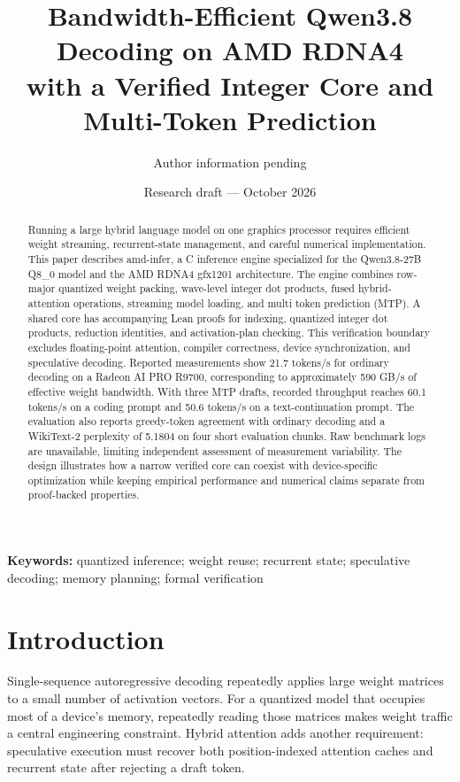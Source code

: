 \documentclass[10pt]{article}
\title{Bandwidth-Efficient Qwen3.8 Decoding on AMD RDNA4\\with a Verified Integer Core and Multi-Token Prediction}
\author{Author information pending}
\date{Research draft --- October 2026}
\begin{document}
\maketitle
\begin{abstract}
Running a large hybrid language model on one graphics processor requires efficient weight streaming, recurrent-state management, and careful numerical implementation. This paper describes amd-infer, a C inference engine specialized for the Qwen3.8-27B Q8\_0 model and the AMD RDNA4 gfx1201 architecture. The engine combines row-major quantized weight packing, wave-level integer dot products, fused hybrid-attention operations, streaming model loading, and multi token prediction (MTP). A shared core has accompanying Lean proofs for indexing, quantized integer dot products, reduction identities, and activation-plan checking. This verification boundary excludes floating-point attention, compiler correctness, device synchronization, and speculative decoding. Reported measurements show 21.7 tokens/s for ordinary decoding on a Radeon AI PRO R9700, corresponding to approximately 590 GB/s of effective weight bandwidth. With three MTP drafts, recorded throughput reaches 60.1 tokens/s on a coding prompt and 50.6 tokens/s on a text-continuation prompt. The evaluation also reports greedy-token agreement with ordinary decoding and a WikiText-2 perplexity of 5.1804 on four short evaluation chunks. Raw benchmark logs are unavailable, limiting independent assessment of measurement variability. The design illustrates how a narrow verified core can coexist with device-specific optimization while keeping empirical performance and numerical claims separate from proof-backed properties.
\end{abstract}
\noindent\textbf{Keywords:} quantized inference; weight reuse; recurrent state; speculative decoding; memory planning; formal verification

\section{Introduction}
Single-sequence autoregressive decoding repeatedly applies large weight matrices to a small number of activation vectors. For a quantized model that occupies most of a device's memory, repeatedly reading those matrices makes weight traffic a central engineering constraint. Hybrid attention adds another requirement: speculative execution must recover both position-indexed attention caches and recurrent state after rejecting a draft token.
\end{document}
